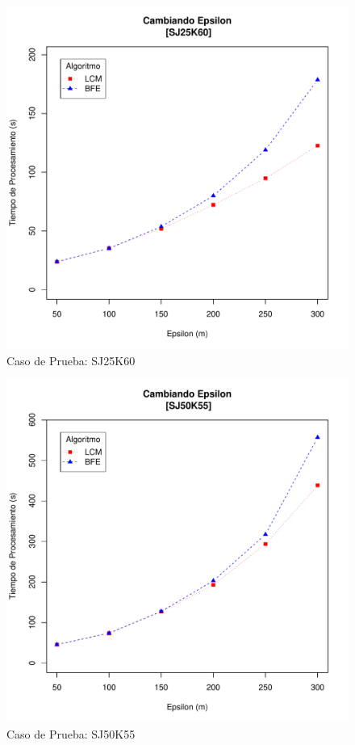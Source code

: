 \begin{figure}
  \centering
  \includegraphics[scale=0.4]{pictures/SJ25K60.pdf}
  \caption{Caso de Prueba: SJ25K60}
  \label{fig:SJ25K60}
\end{figure}

\begin{figure}
  \centering
  \includegraphics[scale=0.4]{pictures/SJ50K55.pdf}
  \caption{Caso de Prueba: SJ50K55}
  \label{fig:SJ50K55}
\end{figure}

